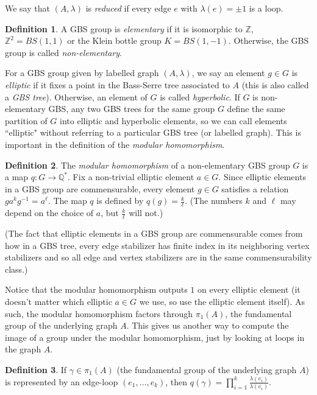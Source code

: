 \documentclass[10pt]{article}
\def\integers{{\mathbb{Z}}}
\def\rationals{{\mathbb Q}}
\theoremstyle{definition}
\newtheorem{definition}{Definition}
\begin{document}
We say that $(A,\lambda)$ is \textit{reduced} if every edge $e$ with $\lambda(e)=\pm 1$ is a loop. 

 \begin{definition}
     A GBS group is \textit{elementary} if it is isomorphic to $\integers$, $\integers^2=BS(1,1)$ or the Klein bottle group $K=BS(1,-1)$. Otherwise, the GBS group is called \textit{non-elementary}. 
 \end{definition}

For a GBS group given by labelled graph $(A,\lambda)$, we say an element $g\in G$ is \textit{elliptic} if it fixes a point in the Bass-Serre tree associated to $A$ (this is also called a \textit{GBS tree}). Otherwise, an element of $G$ is called \textit{hyperbolic}. If $G$ is non-elementary GBS, any two GBS trees for the same group $G$ define the same partition of $G$ into elliptic and hyperbolic elements, so we can call elements  ``elliptic" without referring to a particular GBS tree (or labelled graph). This is important in the definition of the \textit{modular homomorphism}. 

\begin{definition}
The \textit{modular homomorphism} of a non-elementary GBS group $G$ is a map $q:G \to \rationals^*$. Fix a non-trivial elliptic element $a\in G$.  Since elliptic elements in a GBS group are commensurable, every element $g\in G$ satisfies a relation $g a^k g^{-1} = a^\ell$. The map $q$ is  defined by $q(g)=\frac{k}{\ell}$. (The numbers $k$ and $\ell$ may depend on the choice of $a$, but $\frac{k}{\ell}$ will not.)

(The fact that elliptic elements in a GBS group are commensurable comes from how in a GBS tree, every edge stabilizer has finite index in its neighboring vertex stabilizers and so all edge and vertex stabilizers are in the same commensurability class.) 
\end{definition}


Notice that the modular homomorphism outputs $1$ on every elliptic element (it doesn't matter which elliptic $a\in G$ we use, so use the elliptic element itself). As such, the modular homomorphism factors through $\pi_1(A)$, the fundamental group of the underlying graph $A$. This gives us another way to compute the image of a group under the modular homomorphism, just by looking at loops in the graph $A$. 

\begin{definition}\label{modularhom} If $\gamma \in \pi_1(A)$ (the fundamental group of the underlying graph $A$) is represented by an edge-loop $(e_1,\dots,e_k)$, then $q(\gamma)=\prod_{i=1}^k \frac{\lambda(e_i)}{\lambda(\overline{e_i})}$.
    
\end{definition}
\end{document}

